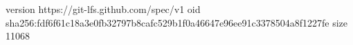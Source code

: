 version https://git-lfs.github.com/spec/v1
oid sha256:fdf6f61c18a3e0fb32797b8cafc529b1f0a46647e96ee91c3378504a8f1227fe
size 11068
